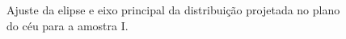 \begin{anexosenv}
\begin{figure}[H]
\caption{Ajuste da elipse e eixo principal da distribuição projetada no plano do céu para a amostra I.}
\label{fig:eixorotation}%
\end{figure}



\end{anexosenv}

